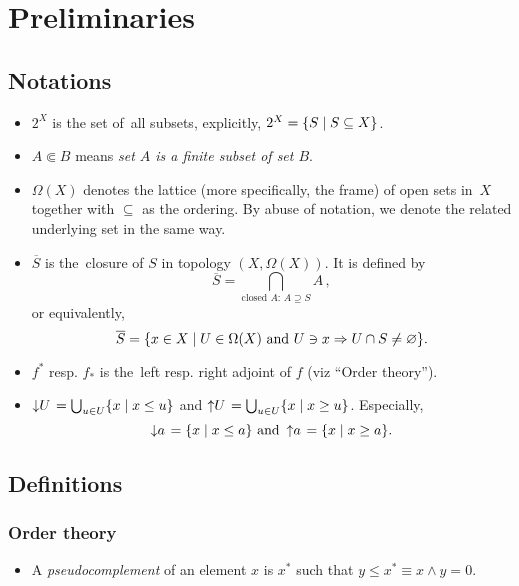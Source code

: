 \chapter{Preliminaries}

\section{Notations}

\begin{itemize}
\item $2^X$ is the set of~all subsets, explicitly, $2^X = \{ S \mid S\subseteq X
\}$.

\item $A \Subset B$ means {\sl set $A$ is a finite subset of set $B$\/}.

\item $\Omega(X)$ denotes the lattice (more specifically, the frame) of open
sets in~$X$ together with $\subseteq$ as the ordering. 
By abuse of notation, we denote the related underlying set in the same way.

\item $\overline{S}$ is the~closure of $S$ in topology $(X, \Omega(X))$.
It is defined by
\[
  \overline{S} = \bigcap_{ \text{closed } A\colon \, A\supseteq S} A
  \, ,
\]
or equivalently,
\[
  \overline{S} = \{ x \in X \mid U\in\Omega(X) \text{ and } U\owns x \Rightarrow
  U \cap S \ne \varnothing \}.
\]
\item $f^*$ resp. $f_*$ is the~left resp. right adjoint of $f$ (viz ``Order
theory'').
\item $\left\downarrow U \right. = \bigcup_{u\in U} \{x \mid x \le u\}$ and
$\left\uparrow U \right. = \bigcup_{u\in U} \{x \mid x \ge u\}$.
Especially,
\[
  \left\downarrow a \right. = \{x \mid x \le a\} \text{ and } \left\uparrow a
  \right. = \{x \mid x \ge a\}.
\]

\end{itemize}

\section{Definitions}

\subsection*{Order theory}

\begin{itemize}
\item A \emph{pseudocomplement} of an element $x$ is $x^*$ such that $y \le x^*
\equiv x \wedge y = 0$.
\end{itemize}


